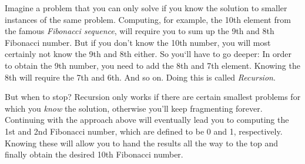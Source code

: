 
Imagine a problem that you can only solve if you know the solution to smaller instances of the same problem. Computing, for example, the 10th element from the famous \emph{Fibonacci sequence}, will require you to sum up the 9th and 8th Fibonacci number. But if you don't know the 10th number, you will most certainly not know the 9th and 8th either. So you`ll have to go deeper: In order to obtain the 9th number, you need to add the 8th and 7th element. Knowing the 8th will require the 7th and 6th. And so on. Doing this is called \emph{Recursion}.

But when to stop? Recursion only works if there are certain smallest problems for which you \emph{know} the solution, otherwise you'll keep fragmenting forever. Continuing with the approach above will eventually lead you to computing the 1st and 2nd Fibonacci number, which are defined to be 0 and 1, respectively. Knowing these will allow you to hand the results all the way to the top and finally obtain the desired 10th Fibonacci number.

